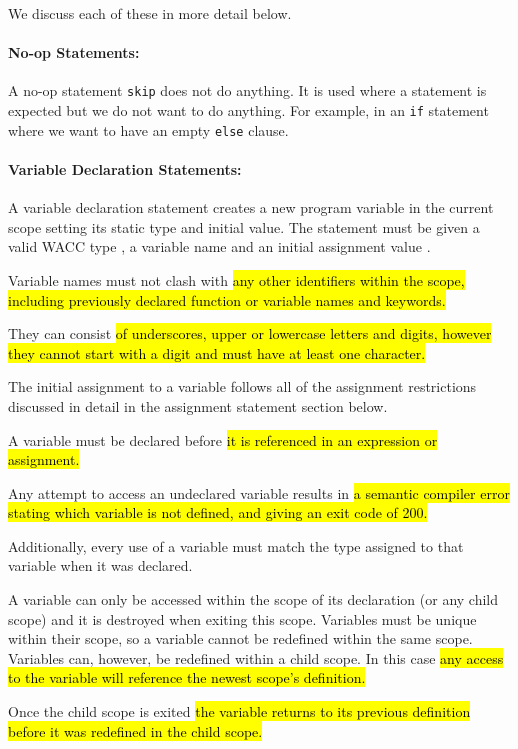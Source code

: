 \documentclass[a4paper]{article}
\theoremstyle{definition}
\begin{document}
We discuss each of these in more detail below.

\paragraph{No-op Statements:}
A no-op statement \texttt{skip} does not do anything.
It is used where a statement is expected but we do not want to do anything.
For example, in an \texttt{if} statement where we want to have an empty \texttt{else} clause.

\paragraph{Variable Declaration Statements:}
A variable declaration statement creates a new program variable in the current scope setting its static type and initial value.
The statement must be given a valid WACC type , a variable name  and an initial assignment value .

Variable names must not clash with \hl{any other identifiers within the scope, including previously declared function or variable names and keywords.}

They can consist \hl{of underscores, upper or lowercase letters and digits, however they cannot start with a digit and must have at least one character.}

The initial assignment to a variable follows all of the assignment restrictions discussed in detail in the assignment statement section below.

A variable must be declared before \hl{it is referenced in an expression or assignment.}

Any attempt to access an undeclared variable results in \hl{a semantic compiler error stating which variable is not defined, and giving an exit code of 200.}

Additionally, every use of a variable must match the type assigned to that variable when it was declared.

A variable can only be accessed within the scope of its declaration (or any child scope) and it is destroyed when exiting this scope.
Variables must be unique within their scope, so a variable cannot be redefined within the same scope.
Variables can, however, be redefined within a child scope.
In this case \hl{any access to the variable will reference the newest scope's definition.}

Once the child scope is exited \hl{the variable returns to its previous definition before it was redefined in the child scope.}
\end{document}
